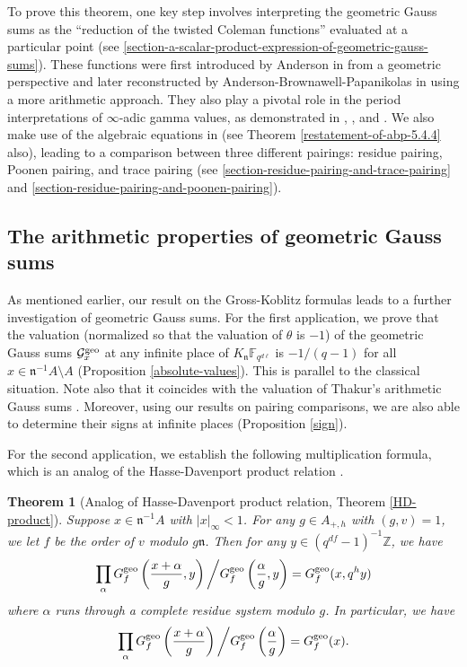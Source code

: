 \documentclass[11pt]{amsart}
\theoremstyle{plain}
\newtheorem{thm}{Theorem}[subsection]
\theoremstyle{definition}
\theoremstyle{remark}
\numberwithin{equation}{section}
\newcommand{\ZZ}{\mathbb{Z}}
\newcommand{\FF}{\mathbb{F}}
\newcommand{\nfk}{\mathfrak{n}}
\newcommand{\Gcal}{\mathcal{G}}
\newcommand{\Fqdl}{\FF_{q^{d\l}}}
\newcommand{\T}{\theta}
\newcommand{\bggs}{\Gcal^{\textnormal{geo}}}
\newcommand{\ggsf}{G_f^{\textnormal{geo}}}
\let\l\ell
\begin{document}
	To prove this theorem, one key step involves interpreting the geometric Gauss sums as the “reduction of the twisted Coleman functions” evaluated at a particular point (see \ref{section-a-scalar-product-expression-of-geometric-gauss-sums}).
	These functions were first introduced by Anderson in \cite{anderson1992twodimensional} from a geometric perspective and later reconstructed by Anderson-Brownawell-Papanikolas in \cite[.5]{abp2004determination} using a more arithmetic approach.
	They also play a pivotal role in the period interpretations of $\infty$-adic gamma values, as demonstrated in \cite{sinha1997periods}, \cite{abp2004determination}, and \cite{wei2022algebraic}.
	We also make use of the algebraic equations in \cite[Theorem 5.4.4]{abp2004determination} (see Theorem \ref{restatement-of-abp-5.4.4} also), leading to a comparison between three different pairings: residue pairing, Poonen pairing, and trace pairing (see \ref{section-residue-pairing-and-trace-pairing} and \ref{section-residue-pairing-and-poonen-pairing}).
	
	\subsection{The arithmetic properties of geometric Gauss sums}     \label{the-section-arithmetic-properties-of-geometric-gauss-sums}
	
	As mentioned earlier, our result on the Gross-Koblitz formulas leads to a further investigation of geometric Gauss sums.
	For the first application, we prove that the valuation (normalized so that the valuation of $\T$ is $-1$) of the geometric Gauss sums $\bggs_x$ at any infinite place of $K_{\nfk}\Fqdl$ is $-1/(q-1)$ for all $x \in \nfk^{-1}A \setminus A$ (Proposition \ref{absolute-values}).
	This is parallel to the classical situation.
	Note also that it coincides with the valuation of Thakur's arithmetic Gauss sums \cite[Theorem IV]{thakur1988gauss}.
	Moreover, using our results on pairing comparisons, we are also able to determine their signs at infinite places (Proposition \ref{sign}).
	
	For the second application, we establish the following multiplication formula, which is an analog of the Hasse-Davenport product relation \cite{hd1935dienullstellen}.
	
	\begin{thm}[Analog of Hasse-Davenport product relation, Theorem \ref{HD-product}]
		Suppose $x \in \nfk^{-1}A$ with $|x|_\infty < 1$.
		For any $g \in A_{+,h}$ with $(g,v) = 1$, we let $f$ be the order of $v$ modulo $g\nfk$.
		Then for any $y \in (q^{df}-1)^{-1}\ZZ$, we have
		$$
		\prod_{\alpha} \ggsf\left( \frac{x+\alpha}{g},y \right) \bigg/ \ggsf\left( \frac{\alpha}{g},y \right) = \ggsf(x,q^hy)
		$$
		where $\alpha$ runs through a complete residue system modulo $g$.
		In particular, we have
		$$
		\prod_{\alpha} \ggsf\left( \frac{x+\alpha}{g} \right) \bigg/ \ggsf\left( \frac{\alpha}{g} \right) = \ggsf(x).
		$$
	\end{thm}
	
\end{document}
